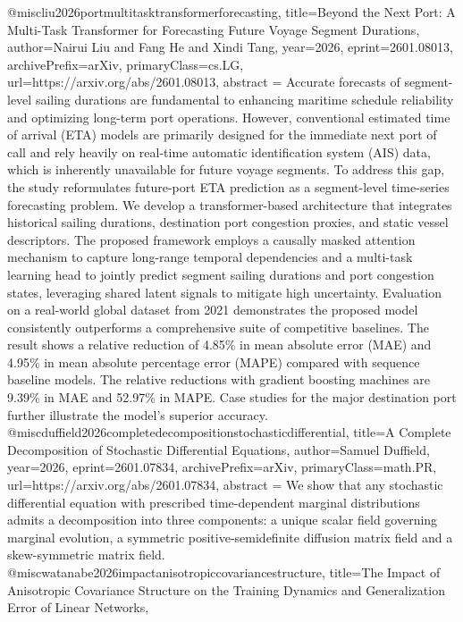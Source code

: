 {}@misc{liu2026portmultitasktransformerforecasting,
      title={Beyond the Next Port: A Multi-Task Transformer for Forecasting Future Voyage Segment Durations}, 
      author={Nairui Liu and Fang He and Xindi Tang},
      year={2026},
      eprint={2601.08013},
      archivePrefix={arXiv},
      primaryClass={cs.LG},
      url={https://arxiv.org/abs/2601.08013},
      abstract = {Accurate forecasts of segment-level sailing durations are fundamental to enhancing maritime schedule reliability and optimizing long-term port operations. However, conventional estimated time of arrival (ETA) models are primarily designed for the immediate next port of call and rely heavily on real-time automatic identification system (AIS) data, which is inherently unavailable for future voyage segments. To address this gap, the study reformulates future-port ETA prediction as a segment-level time-series forecasting problem. We develop a transformer-based architecture that integrates historical sailing durations, destination port congestion proxies, and static vessel descriptors. The proposed framework employs a causally masked attention mechanism to capture long-range temporal dependencies and a multi-task learning head to jointly predict segment sailing durations and port congestion states, leveraging shared latent signals to mitigate high uncertainty. Evaluation on a real-world global dataset from 2021 demonstrates the proposed model consistently outperforms a comprehensive suite of competitive baselines. The result shows a relative reduction of 4.85\% in mean absolute error (MAE) and 4.95\% in mean absolute percentage error (MAPE) compared with sequence baseline models. The relative reductions with gradient boosting machines are 9.39\% in MAE and 52.97\% in MAPE. Case studies for the major destination port further illustrate the model's superior accuracy.}
}@misc{duffield2026completedecompositionstochasticdifferential,
      title={A Complete Decomposition of Stochastic Differential Equations}, 
      author={Samuel Duffield},
      year={2026},
      eprint={2601.07834},
      archivePrefix={arXiv},
      primaryClass={math.PR},
      url={https://arxiv.org/abs/2601.07834},
      abstract = {We show that any stochastic differential equation with prescribed time-dependent marginal distributions admits a decomposition into three components: a unique scalar field governing marginal evolution, a symmetric positive-semidefinite diffusion matrix field and a skew-symmetric matrix field.}
}@misc{watanabe2026impactanisotropiccovariancestructure,
      title={The Impact of Anisotropic Covariance Structure on the Training Dynamics and Generalization Error of Linear Networks}, 
}
